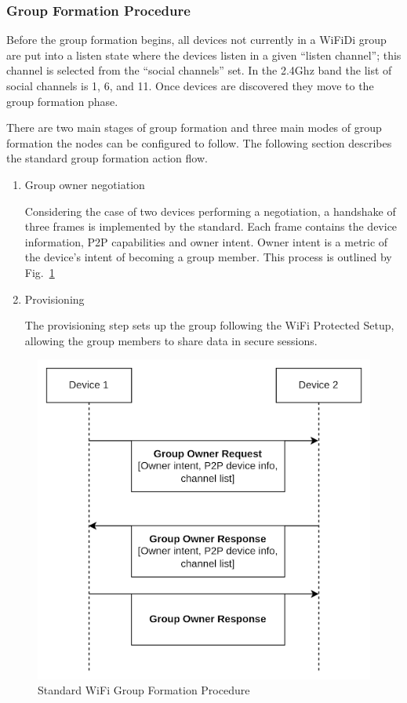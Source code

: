 \subsubsection{Group Formation Procedure}

Before the group formation begins, all devices not currently in a WiFiDi group
are put into a listen state where the devices listen in a given “listen
channel”; this channel is selected from the “social channels” set. In the
2.4Ghz band the list of social channels is 1, 6, and 11\cite{wifidispec}. Once
devices are discovered they move to the group formation phase.

There are two main stages of group formation and three main modes of group
formation the nodes can be configured to follow. The following section
describes the standard group formation action flow.

\begin{enumerate}
    \item Group owner negotiation

          Considering the case of two devices performing a negotiation, a
          handshake of three frames is implemented by the standard. Each frame
          contains
          the device information, P2P capabilities and owner
          intent\cite{wifidispec}.
          Owner intent is a metric of the device’s intent of becoming a group
          member. This process is outlined by Fig.~\ref{formproc}

    \item Provisioning

          The provisioning step sets up the group following the WiFi Protected
          Setup\cite{wifidispec}, allowing the group members to share data in
          secure
          sessions.

\end{enumerate}

\begin{figure}[htbp]
    \centerline{\includegraphics[height=0.45\textwidth]{imgs/formproc.png}}
    \caption{Standard WiFi Group Formation Procedure}
    \label{formproc}
\end{figure}


